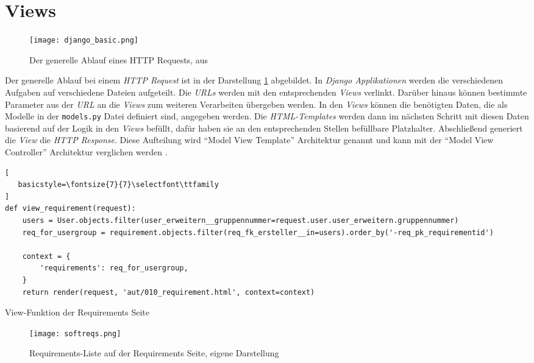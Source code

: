 \documentclass[11pt,a4paper]{report}
\begin{document}
\section{Views}
\label{iviews}

\begin{figure}[htpb]
  \centering
  \texttt{[image: django\_basic.png]}
  \caption{Der generelle Ablauf eines HTTP Requests, aus \cite{mozillatuto1}}
  \label{f:django_basic}
\end{figure}

Der generelle Ablauf bei einem \textit{HTTP Request} ist in der Darstellung \ref{f:django_basic} abgebildet. In \textit{Django Applikationen} werden die verschiedenen Aufgaben auf verschiedene Dateien aufgeteilt. Die \textit{URLs} werden mit den entsprechenden \textit{Views} verlinkt. Darüber hinaus können bestimmte Parameter aus der \textit{URL} an die \textit{Views} zum weiteren Verarbeiten übergeben werden. In den \textit{Views} können die benötigten Daten, die als Modelle in der \verb|models.py| Datei definiert sind, angegeben werden. Die \textit{HTML-Templates} werden dann im nächsten Schritt mit diesen Daten basierend auf der Logik in den \textit{Views} befüllt, dafür haben sie an den entsprechenden Stellen befüllbare Platzhalter. Abschließend generiert die \textit{View} die \textit{HTTP Response}. Diese Aufteilung wird "`Model View Template"' Architektur genannt \cite{mozillatuto1} und kann mit der "`Model View Controller"' Architektur verglichen werden \cite{mvc}.


\begin{listing}[htbp]
\begin{lstlisting}[
   basicstyle=\fontsize{7}{7}\selectfont\ttfamily
]
def view_requirement(request):
    users = User.objects.filter(user_erweitern__gruppennummer=request.user.user_erweitern.gruppennummer)
    req_for_usergroup = requirement.objects.filter(req_fk_ersteller__in=users).order_by('-req_pk_requirementid')

    context = {
        'requirements': req_for_usergroup,
    }
    return render(request, 'aut/010_requirement.html', context=context)
\end{lstlisting}
\caption{View-Funktion der Requirements Seite}
\label{code:allrequirements}
\end{listing}




\begin{figure}[htpb]
  \centering
  \texttt{[image: softreqs.png]}
  \caption{Requirements-Liste auf der Requirements Seite, eigene Darstellung}
  \label{f:softreqs}
\end{figure}
\end{document}
